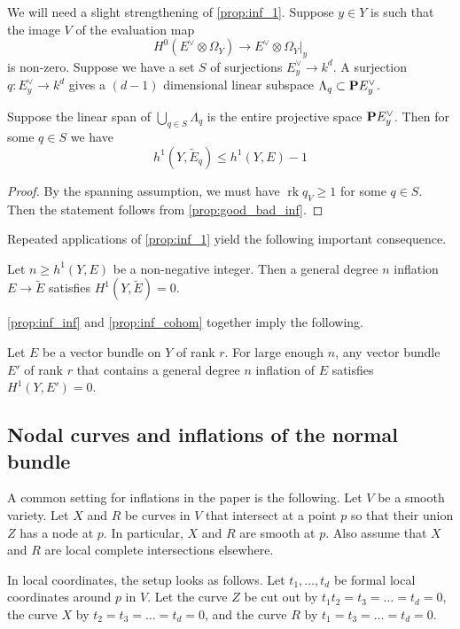 \documentclass[11 pt]{amsart}
\renewcommand {\P}{{\bf P}}
\providecommand {\from}{{\colon}}
\providecommand{\rk}{\operatorname{rk}}
\numberwithin{equation}{section}
\begin{document}
We will need a slight strengthening of \autoref{prop:inf_1}.
Suppose $y \in Y$ is such that the image $V$ of the evaluation map
\[H^0(E^\vee \otimes \Omega_Y) \to E^\vee\otimes \Omega_Y|_y\]
is non-zero.
Suppose we have a set $S$ of surjections $E^\vee_y \to k^d$.
A surjection $q \from E^\vee_y \to k^d$ gives a $(d-1)$ dimensional linear subspace $\Lambda_q \subset \P E^\vee_y$.
\begin{proposition}\label{prop:lingen_1}
  Suppose the linear span of $\bigcup_{q \in S} \Lambda_q$ is the entire projective space $\P E^\vee_y$.
  Then for some $q \in S$ we have
  \[ h^1(Y, \widetilde E_q) \leq h^1(Y, E) - 1\]
\end{proposition}
\begin{proof}
  By the spanning assumption, we must have $\rk q_V \geq 1$ for some $q \in S$.
  Then the statement follows from \autoref{prop:good_bad_inf}.
\end{proof}

Repeated applications of \autoref{prop:inf_1} yield the following important consequence.
\begin{corollary}
  \label{prop:inf_cohom}
  Let $n \geq h^1(Y, E)$ be a non-negative integer.
  Then a general degree $n$ inflation $E \to \widetilde E$ satisfies $H^1(Y, \widetilde E) = 0$.
\end{corollary}

\autoref{prop:inf_inf} and \autoref{prop:inf_cohom} together imply the following.
\begin{corollary}\label{cor:gen_inf}
  Let $E$ be a vector bundle on $Y$ of rank $r$.
  For large enough $n$, any vector bundle $E'$ of rank $r$ that contains a general degree $n$ inflation of $E$ satisfies $H^1(Y, E') = 0$.
\end{corollary}

\subsection{Nodal curves and inflations of the normal bundle}
\label{sec:normal_inflation}
A common setting for inflations in the paper is the following.
Let $V$ be a  smooth variety.
Let $X$ and $R$ be curves in $V$ that intersect at a point $p$ so that their union $Z$ has a node at $p$.
In particular, $X$ and $R$ are smooth at $p$.
Also assume that $X$ and $R$ are local complete intersections elsewhere.

In local coordinates, the setup looks as follows.
Let $t_1, \dots, t_d$ be formal local coordinates around $p$ in $V$.
Let the curve $Z$ be cut out by $t_1t_2 = t_3 = \dots = t_d = 0$, the curve $X$ by $t_2 = t_3 = \dots = t_d = 0$, and the curve $R$ by $t_1 = t_3 = \dots = t_d = 0$.
\end{document}

